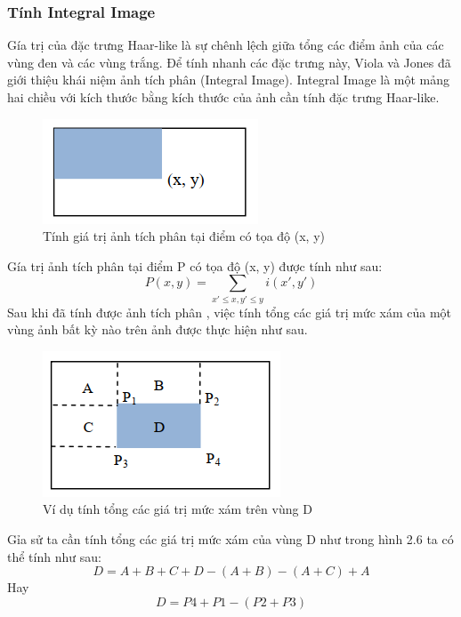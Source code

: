 \documentclass[12pt,a4paper]{article}
\begin{document}
\subsubsection{Tính Integral Image}
Gía trị của đặc trưng Haar-like là sự chênh lệch giữa tổng các điểm ảnh của các vùng đen và các vùng trắng. Để tính nhanh các đặc trưng này, Viola và Jones đã giới thiệu khái niệm ảnh tích phân (Integral Image). Integral Image là một mảng hai chiều với kích thước bằng kích thước của ảnh cần tính đặc trưng Haar-like.
\begin{center}
    \begin{figure}[htp]
    \begin{center}
    \includegraphics[scale=.7]{Images/integral}
    \end{center}
    \caption{Tính giá trị ảnh tích phân tại điểm có tọa độ (x, y)}
    \end{figure}
\end{center}
Gía trị ảnh tích phân tại điểm P có tọa độ (x, y) được tính như sau:
\begin{equation}
    P(x, y) = \sum_{x' \leqslant x, y' \leqslant y} i(x', y')
\end{equation}
Sau khi đã tính được ảnh tích phân , việc tính tổng các giá trị mức xám của một vùng ảnh bất kỳ nào trên ảnh được thực hiện như sau.
\begin{center}
    \begin{figure}[htp]
    \begin{center}
    \includegraphics[scale=.7]{Images/integral1}
    \end{center}
    \caption{Ví dụ tính tổng các giá trị mức xám trên vùng D}
    \end{figure}
\end{center}
Gỉa sử ta cần tính tổng các giá trị mức xám của vùng D như trong hình  2.6 ta có thể tính như sau:
\begin{equation}
    D = A + B + C + D - (A + B) - (A + C) + A
\end{equation}
Hay
\begin{equation}
	D = P4 + P1 - (P2 + P3)
\end{equation}
\pagebreak
\end{document}
